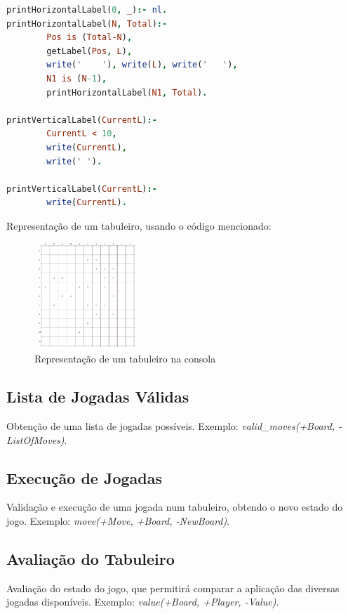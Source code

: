 \documentclass[a4paper]{article}
\begin{document}
\begin{lstlisting}[language=prolog]
printHorizontalLabel(0, _):- nl.
printHorizontalLabel(N, Total):-
        Pos is (Total-N),
        getLabel(Pos, L),
        write('    '), write(L), write('   '),
        N1 is (N-1),
        printHorizontalLabel(N1, Total).        

printVerticalLabel(CurrentL):-
        CurrentL < 10,
        write(CurrentL),
        write(' ').

printVerticalLabel(CurrentL):-
        write(CurrentL).

\end{lstlisting}

Representação de um tabuleiro, usando o código mencionado:\newline

\begin{figure}[h!]
\begin{center}
	\includegraphics[height=4cm, width=4cm]{images/self_semi_board.png}
	\caption{Representação de um tabuleiro na consola}
	\label{Figura 9}
\end{center}
\end{figure}

\newpage

\subsection{Lista de Jogadas Válidas} Obtenção de uma lista de jogadas possíveis. Exemplo: \textit{valid\_moves(+Board, -ListOfMoves)}.

\newpage

\subsection{Execução de Jogadas} Validação e execução de uma jogada num tabuleiro, obtendo o novo estado do jogo. Exemplo: \textit{move(+Move, +Board, -NewBoard)}.

\newpage

\subsection{Avaliação do Tabuleiro} Avaliação do estado do jogo, que permitirá comparar a aplicação das diversas jogadas disponíveis. Exemplo: \textit{value(+Board, +Player, -Value)}.
\end{document}
